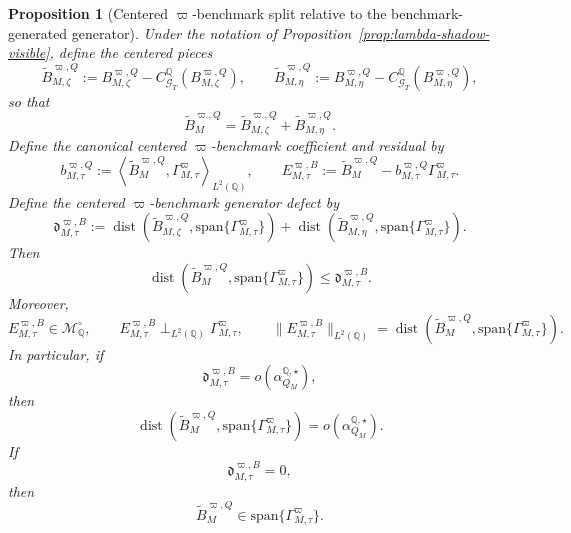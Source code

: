 \documentclass[11pt,a4paper]{amsart}
\theoremstyle{plain}
\newtheorem{proposition}[theorem]{Proposition}
\theoremstyle{definition}
\theoremstyle{remark}
\DeclareMathOperator{\dist}{dist}
\newcommand{\QQ}{\mathbb{Q}}
\newcommand{\cG}{\mathcal{G}}
\newcommand{\cM}{\mathcal{M}}
\begin{document}
\begin{proposition}[Centered \(\varpi\)-benchmark split relative to the benchmark-generated generator]\label{prop:lambda-shadow-benchmark}
Under the notation of Proposition~\ref{prop:lambda-shadow-visible}, define the centered pieces
\[
        \widetilde B_{M,\zeta}^{\varpi,Q}
        :=
        B_{M,\zeta}^{\varpi,Q}
        -
        C_{\cG_T}^\QQ(B_{M,\zeta}^{\varpi,Q}),
        \qquad
        \widetilde B_{M,\eta}^{\varpi,Q}
        :=
        B_{M,\eta}^{\varpi,Q}
        -
        C_{\cG_T}^\QQ(B_{M,\eta}^{\varpi,Q}),
\]
so that
\[
        \widetilde B_{M}^{\varpi,Q}
        =
        \widetilde B_{M,\zeta}^{\varpi,Q}
        +
        \widetilde B_{M,\eta}^{\varpi,Q}.
\]
Define the canonical centered \(\varpi\)-benchmark coefficient and residual by
\[
        b_{M,\tau}^{\varpi,Q}
        :=
        \left\langle
                \widetilde B_{M}^{\varpi,Q},
                \Gamma_{M,\tau}^\varpi
        \right\rangle_{L^2(\QQ)},
        \qquad
        E_{M,\tau}^{\varpi,B}
        :=
        \widetilde B_{M}^{\varpi,Q}
        -
        b_{M,\tau}^{\varpi,Q}\Gamma_{M,\tau}^\varpi.
\]
Define the centered \(\varpi\)-benchmark generator defect by
\[
        \mathfrak d_{M,\tau}^{\varpi,B}
        :=
        \dist\!\left(
                \widetilde B_{M,\zeta}^{\varpi,Q},
                \mathrm{span}\{\Gamma_{M,\tau}^\varpi\}
        \right)
        +
        \dist\!\left(
                \widetilde B_{M,\eta}^{\varpi,Q},
                \mathrm{span}\{\Gamma_{M,\tau}^\varpi\}
        \right).
\]
Then
\[
        \dist\!\left(
                \widetilde B_{M}^{\varpi,Q},
                \mathrm{span}\{\Gamma_{M,\tau}^\varpi\}
        \right)
        \le
        \mathfrak d_{M,\tau}^{\varpi,B}.
\]
Moreover,
\[
        E_{M,\tau}^{\varpi,B}\in \cM_\QQ^\circ,
        \qquad
        E_{M,\tau}^{\varpi,B}
        \perp_{L^2(\QQ)}
        \Gamma_{M,\tau}^\varpi,
        \qquad
        \|E_{M,\tau}^{\varpi,B}\|_{L^2(\QQ)}
        =
        \dist\!\left(
                \widetilde B_{M}^{\varpi,Q},
                \mathrm{span}\{\Gamma_{M,\tau}^\varpi\}
        \right).
\]
In particular, if
\[
        \mathfrak d_{M,\tau}^{\varpi,B}
        =
        o\!\left(\alpha_{Q_M}^{\QQ,\star}\right),
\]
then
\[
        \dist\!\left(
                \widetilde B_{M}^{\varpi,Q},
                \mathrm{span}\{\Gamma_{M,\tau}^\varpi\}
        \right)
        =
        o\!\left(\alpha_{Q_M}^{\QQ,\star}\right).
\]
If
\[
        \mathfrak d_{M,\tau}^{\varpi,B}=0,
\]
then
\[
        \widetilde B_{M}^{\varpi,Q}\in \mathrm{span}\{\Gamma_{M,\tau}^\varpi\}.
\]
\end{proposition}
\end{document}
